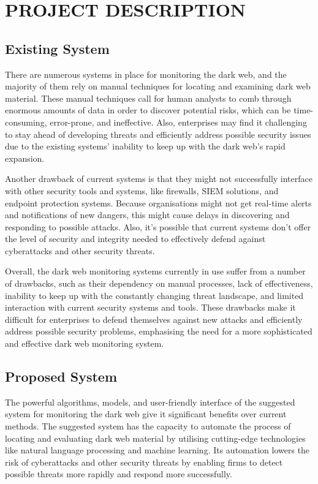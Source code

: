 \documentclass[10pt]{report}
\begin{document}
\linespread{1.5}
\chapter{PROJECT DESCRIPTION}
\linespread{1.5}
\section{Existing System}
There are numerous systems in place for monitoring the dark web, and the majority of them rely on manual techniques for locating and examining dark web material. These manual techniques call for human analysts to comb through enormous amounts of data in order to discover potential risks, which can be time-consuming, error-prone, and ineffective. Also, enterprises may find it challenging to stay ahead of developing threats and efficiently address possible security issues due to the existing systems' inability to keep up with the dark web's rapid expansion.

Another drawback of current systems is that they might not successfully interface with other security tools and systems, like firewalls, SIEM solutions, and endpoint protection systems. Because organisations might not get real-time alerts and notifications of new dangers, this might cause delays in discovering and responding to possible attacks. Also, it's possible that current systems don't offer the level of security and integrity needed to effectively defend against cyberattacks and other security threats.

Overall, the dark web monitoring systems currently in use suffer from a number of drawbacks, such as their dependency on manual processes, lack of effectiveness, inability to keep up with the constantly changing threat landscape, and limited interaction with current security systems and tools. These drawbacks make it difficult for enterprises to defend themselves against new attacks and efficiently address possible security problems, emphasising the need for a more sophisticated and effective dark web monitoring system.
\section{Proposed System}
The powerful algorithms, models, and user-friendly interface of the suggested system for monitoring the dark web give it significant benefits over current methods. The suggested system has the capacity to automate the process of locating and evaluating dark web material by utilising cutting-edge technologies like natural language processing and machine learning. Its automation lowers the risk of cyberattacks and other security threats by enabling firms to detect possible threats more rapidly and respond more successfully.
\end{document}
